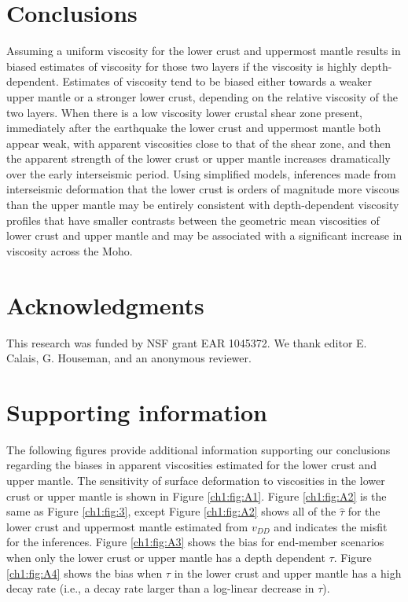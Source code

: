 \section{Conclusions}
Assuming a uniform viscosity for the lower crust and uppermost mantle
results in biased estimates of viscosity for those two layers if the
viscosity is highly depth-dependent.  Estimates of viscosity tend to
be biased either towards a weaker upper mantle or a stronger lower
crust, depending on the relative viscosity of the two layers.  When
there is a low viscosity lower crustal shear zone present, immediately
after the earthquake the lower crust and uppermost mantle both appear
weak, with apparent viscosities close to that of the shear zone, and
then the apparent strength of the lower crust or upper mantle
increases dramatically over the early interseismic period.  Using
simplified models, inferences made from interseismic deformation that
the lower crust is orders of magnitude more viscous than the upper
mantle may be entirely consistent with depth-dependent viscosity
profiles that have smaller contrasts between the geometric mean
viscosities of lower crust and upper mantle and may be associated with
a significant increase in viscosity across the Moho.

\section{Acknowledgments}
This research was funded by NSF grant EAR 1045372. We thank editor E.
Calais, G. Houseman, and an anonymous reviewer.

%
%

\section{Supporting information}
The following figures provide additional information supporting our
conclusions regarding the biases in apparent viscosities estimated for
the lower crust and upper mantle. The sensitivity of surface
deformation to viscosities in the lower crust or upper mantle is shown
in Figure \ref{ch1:fig:A1}.  Figure \ref{ch1:fig:A2} is the same as
Figure \ref{ch1:fig:3}, except Figure \ref{ch1:fig:A2} shows all of
the $\hat{\tau}$ for the lower crust and uppermost mantle estimated
from $v_{DD}$ and indicates the misfit for the inferences. Figure
\ref{ch1:fig:A3} shows the bias for end-member scenarios when only the
lower crust or upper mantle has a depth dependent $\tau$. Figure
\ref{ch1:fig:A4} shows the bias when $\tau$ in the lower crust and upper
mantle has a high decay rate (i.e., a decay rate larger than a
log-linear decrease in $\tau$).

